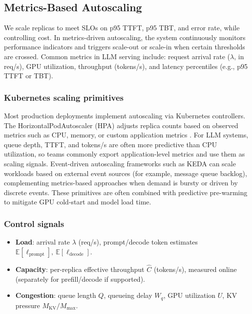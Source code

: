 \subsection{Metrics-Based Autoscaling}
\label{sec:scaling-metrics-autoscaling}
We scale replicas to meet SLOs on p95 TTFT, p95 TBT, and error rate, while controlling cost. In metrics-driven autoscaling, the system continuously monitors performance indicators and triggers scale-out or scale-in when certain thresholds are crossed. Common metrics in LLM serving include: request arrival rate ($\lambda$, in req/s), GPU utilization, throughput (tokens/s), and latency percentiles (e.g., p95 TTFT or TBT).

\subsubsection{Kubernetes scaling primitives}
Most production deployments implement autoscaling via Kubernetes controllers. The HorizontalPodAutoscaler (HPA) adjusts replica counts based on observed metrics such as CPU, memory, or custom application metrics \cite{k8s_hpa_docs}. For LLM systems, queue depth, TTFT, and tokens/s are often more predictive than CPU utilization, so teams commonly export application-level metrics and use them as scaling signals. Event-driven autoscaling frameworks such as KEDA can scale workloads based on external event sources (for example, message queue backlog), complementing metrics-based approaches when demand is bursty or driven by discrete events. These primitives are often combined with predictive pre-warming to mitigate GPU cold-start and model load time.

\subsubsection{Control signals}
\begin{itemize}
  \item \textbf{Load}: arrival rate $\lambda$ (req/s), prompt/decode token estimates $\mathbb{E}[\ell_{\text{prompt}}],\ \mathbb{E}[\ell_{\text{decode}}]$.
  \item \textbf{Capacity}: per-replica effective throughput $\hat{C}$ (tokens/s), measured online (separately for prefill/decode if supported).
  \item \textbf{Congestion}: queue length $Q$, queueing delay $W_q$, GPU utilization $U$, KV pressure $M_{\mathrm{KV}}/M_{\max}$.
\end{itemize}

